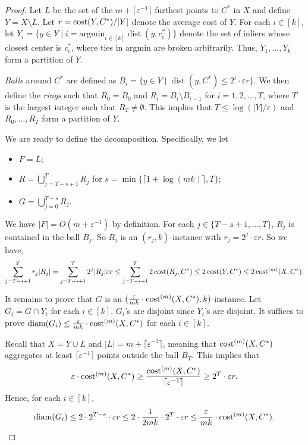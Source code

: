 \documentclass[11pt,letterpaper]{article}
\theoremstyle{definition}
\newcommand{\eps}{\varepsilon}
\DeclareMathOperator{\diam}{diam}
\DeclareMathOperator{\dist}{dist}
\begin{document}
\begin{proof}
	Let $L$ be the set of the $m+\lceil \eps^{-1} \rceil$ furthest points to $C^\ast$ in $X$ and define $Y=X\setminus L$. Let $r = \cost(Y,C^\ast)/|Y|$ denote the average cost of $Y$. For each $i\in[k]$, let $Y_i = \{y\in Y\mid i=\mathrm{argmin}_{i\in [k]} \dist(y,c_i^\ast)\}$ denote the set of inliers whose closest center is $c_i^\ast$, where ties in $\mathrm{argmin}$ are broken arbitrarily. Thus, $Y_1,\dots,Y_k$ form a partition of $Y$.
	
	\emph{Balls} around $C^\ast$ are defined as $B_i=\{y\in Y\mid \dist(y,C^\ast)\leq 2^i\cdot\eps r\}$. We then define the \emph{rings} such that $R_0=B_0$ and $R_i=B_i\setminus B_{i-1}$ for $i=1,2,\dots,T$, where $T$ is the largest integer such that $R_T\neq\emptyset$. This implies that $T\leq \log(|Y|/\eps)$ and $R_0,\dots,R_T$ form a partition of $Y$. 
	
	We are ready to define the decomposition. Specifically, we let
	
	\begin{itemize}[itemsep=0pt,topsep=0pt]
		\item $F = L$;
		\item $R = \bigcup_{j=T-s+1}^T R_j$ for $s=\min\{\lceil 1 + \log (mk) \rceil,T\}$;
		\item $G = \bigcup_{j=0}^{T-s} R_j$. 
	\end{itemize}
	
	We have $|F|= O(m+\eps^{-1})$ by definition. For each $j\in \{T-s+1,\dots,T\}$, $R_j$ is contained in the ball $B_j$. So $R_j$ is an $(r_j ,k)$-instance with $r_j=2^j \cdot \eps r$. So we have,
	$$
	\sum_{j=T-s+1}^T r_j|R_j|=\sum_{j=T-s+1}^T 2^j |R_j| \eps r\leq \sum_{j=T-s+1}^T 2\cost(R_j,C^\ast)\leq 2\cost(Y,C^\ast)\leq 2\cost^{(m)}(X,C^\ast).
	$$
	
	It remains to prove that $G$ is an $(\frac{\eps}{mk}\cdot \cost^{(m)}(X,C^\ast),k)$-instance. Let $G_i=G\cap Y_i$ for each $i\in [k]$. $G_i$'s are disjoint since $Y_i$'s are disjoint. It suffices to prove $\mathrm{diam}(G_i)\leq \frac{\eps}{mk}\cdot \cost^{(m)}(X,C^\ast)$ for each $i\in [k]$.
	
	Recall that $X=Y\cup L$ and $|L|=m+\lceil \eps^{-1}\rceil$, meaning that $\cost[m](X,C^\ast)$ aggregates at least $\lceil \eps^{-1}\rceil$ points outside the ball $B_T$. This implies that
	\[
	\eps\cdot \cost[m](X,C^\ast)\geq  \frac{\cost[m](X,C^\ast)}{\lceil \eps^{-1}\rceil}\geq 2^T\cdot \eps r.
	\]
	Hence, for each $i\in [k]$,
	\[
	\diam(G_i) \leq 2\cdot 2^{T-s}\cdot \eps r\leq 2\cdot \frac{1}{2mk}\cdot 2^T\cdot \eps r\leq \frac{\eps}{mk}\cdot \cost[m](X,C^\ast). \qedhere
	\]
	
	
\end{proof}
\end{document}
